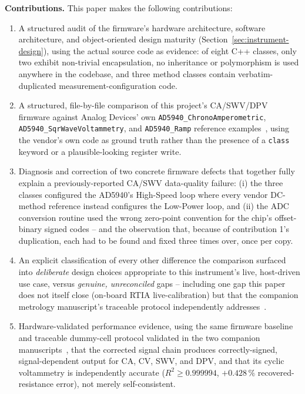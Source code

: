 \textbf{Contributions.} This paper makes the following contributions:
\begin{enumerate}
\item A structured audit of the firmware's hardware architecture, software
  architecture, and object-oriented design maturity
  (Section~\ref{sec:instrument-design}), using the actual source code as
  evidence: of eight C++ classes, only two exhibit non-trivial
  encapsulation, no inheritance or polymorphism is used anywhere in the
  codebase, and three method classes contain verbatim-duplicated
  measurement-configuration code.
\item A structured, file-by-file comparison of this project's CA/SWV/DPV
  firmware against Analog Devices' own \texttt{AD5940\_ChronoAmperometric},
  \texttt{AD5940\_SqrWaveVoltammetry}, and \texttt{AD5940\_Ramp} reference
  examples~\cite{ad5940_examples_github}, using the vendor's own code as
  ground truth rather than the presence of a \texttt{class} keyword or a
  plausible-looking register write.
\item Diagnosis and correction of two concrete firmware defects that
  together fully explain a previously-reported CA/SWV data-quality
  failure: (i) the three classes configured the AD5940's High-Speed
  loop where every vendor DC-method reference instead configures the
  Low-Power loop, and (ii) the ADC conversion routine used the wrong
  zero-point convention for the chip's offset-binary signed codes -- and
  the observation that, because of contribution 1's duplication, each had
  to be found and fixed three times over, once per copy.
\item An explicit classification of every other difference the comparison
  surfaced into \emph{deliberate} design choices appropriate to this
  instrument's live, host-driven use case, versus \emph{genuine,
  unreconciled} gaps -- including one gap this paper does not itself close
  (on-board RTIA live-calibration) but that the companion metrology
  manuscript's traceable protocol independently
  addresses~\cite{clement2026linearity}.
\item Hardware-validated performance evidence, using the same firmware
  baseline and traceable dummy-cell protocol validated in the two
  companion manuscripts~\cite{clement2026linearity,clement2026architecture},
  that the corrected signal chain produces correctly-signed,
  signal-dependent output for CA, CV, SWV, and DPV, and that its cyclic
  voltammetry is independently accurate ($R^2\geq0.999994$,
  $+0.428\,\%$ recovered-resistance error), not merely self-consistent.
\end{enumerate}

